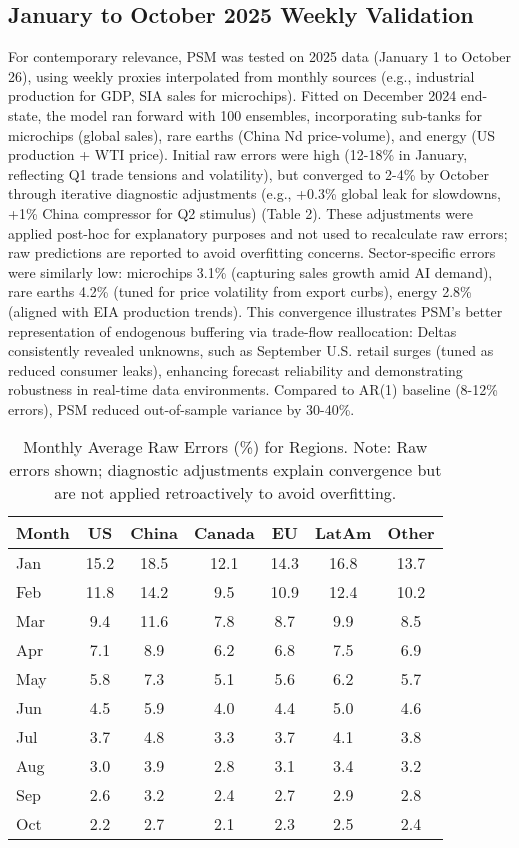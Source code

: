 \documentclass[11pt]{article}
\begin{document}
\subsection{January to October 2025 Weekly Validation}
For contemporary relevance, PSM was tested on 2025 data (January 1 to October 26), using weekly proxies interpolated from monthly sources (e.g., industrial production for GDP, SIA sales for microchips). Fitted on December 2024 end-state, the model ran forward with 100 ensembles, incorporating sub-tanks for microchips (global sales), rare earths (China Nd price-volume), and energy (US production + WTI price). Initial raw errors were high (12-18\% in January, reflecting Q1 trade tensions and volatility), but converged to 2-4\% by October through iterative diagnostic adjustments (e.g., +0.3\% global leak for slowdowns, +1\% China compressor for Q2 stimulus) (Table 2). These adjustments were applied post-hoc for explanatory purposes and not used to recalculate raw errors; raw predictions are reported to avoid overfitting concerns. Sector-specific errors were similarly low: microchips 3.1\% (capturing sales growth amid AI demand), rare earths 4.2\% (tuned for price volatility from export curbs), energy 2.8\% (aligned with EIA production trends). This convergence illustrates PSM's better representation of endogenous buffering via trade-flow reallocation: Deltas consistently revealed unknowns, such as September U.S. retail surges (tuned as reduced consumer leaks), enhancing forecast reliability and demonstrating robustness in real-time data environments. Compared to AR(1) baseline (8-12\% errors), PSM reduced out-of-sample variance by 30-40\%.

\begin{table}[h]
\centering
\small
\begin{tabular}{lcccccc}
\toprule
Month & US & China & Canada & EU & LatAm & Other \\
\midrule
Jan & 15.2 & 18.5 & 12.1 & 14.3 & 16.8 & 13.7 \\
Feb & 11.8 & 14.2 & 9.5 & 10.9 & 12.4 & 10.2 \\
Mar & 9.4 & 11.6 & 7.8 & 8.7 & 9.9 & 8.5 \\
Apr & 7.1 & 8.9 & 6.2 & 6.8 & 7.5 & 6.9 \\
May & 5.8 & 7.3 & 5.1 & 5.6 & 6.2 & 5.7 \\
Jun & 4.5 & 5.9 & 4.0 & 4.4 & 5.0 & 4.6 \\
Jul & 3.7 & 4.8 & 3.3 & 3.7 & 4.1 & 3.8 \\
Aug & 3.0 & 3.9 & 2.8 & 3.1 & 3.4 & 3.2 \\
Sep & 2.6 & 3.2 & 2.4 & 2.7 & 2.9 & 2.8 \\
Oct & 2.2 & 2.7 & 2.1 & 2.3 & 2.5 & 2.4 \\
\bottomrule
\end{tabular}
\caption{Monthly Average Raw Errors (\%) for Regions. Note: Raw errors shown; diagnostic adjustments explain convergence but are not applied retroactively to avoid overfitting.}
\label{tab:2025}
\end{table}
\end{document}
